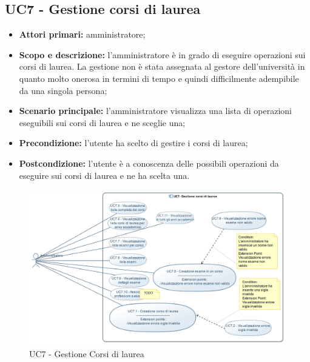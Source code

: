 \documentclass[AnalisiDeiRequisiti.tex]{subfiles}
\begin{document}
\subsection{UC7 - Gestione corsi di laurea}
\begin{itemize}
	\item \textbf{Attori primari:} amministratore;
	\item \textbf{Scopo e descrizione:} l'amministratore è in grado di eseguire operazioni sui corsi di laurea. La gestione non è stata assegnata al gestore dell'università in quanto molto onerosa in termini di tempo e quindi difficilmente adempibile da una singola persona;
	\item \textbf{Scenario principale:} l'amministratore visualizza una lista di operazioni eseguibili sui corsi di laurea e ne sceglie una;
	\item \textbf{Precondizione:} l'utente ha scelto di gestire i corsi di laurea; 
	\item \textbf{Postcondizione:} l'utente è a conoscenza delle possibili operazioni da eseguire sui corsi di laurea e ne ha scelta una.
\end{itemize}

\begin{figure}[H]
	\centering
	\includegraphics[width=1.1\linewidth]{UC7.jpg}
	\caption{UC7 - Gestione Corsi di laurea}
	\label{fig:UC7 - Gestione Corsi di laurea}
\end{figure}
\end{document}
